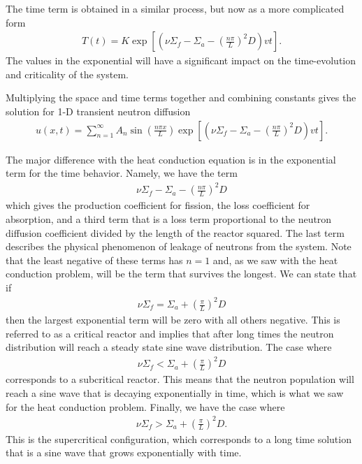 The time term is obtained in a similar process, but now as a more complicated form
\begin{align}
  T(t) = K \exp \left[ \left( \nu \Sigma_f - \Sigma_a - \left( \frac{n \pi}{L} \right)^2 D \right) vt \right] .
\end{align}
The values in the exponential will have a significant impact on the time-evolution and criticality of the system. 

Multiplying the space and time terms together and combining constants gives the solution for 1-D transient neutron diffusion
\begin{align}
  u(x,t) = \sum_{n=1}^\infty A_n \sin \left( \frac{ n \pi x }{ L } \right) \exp \left[ \left( \nu \Sigma_f - \Sigma_a - \left( \frac{n \pi}{L} \right)^2 D \right) v t \right]  .
\end{align}

The major difference with the heat conduction equation is in the exponential term for the time behavior. Namely, we have the term
\begin{align}
   \nu \Sigma_f - \Sigma_a - \left( \frac{n \pi}{L} \right)^2 D \nonumber
\end{align}
which gives the production coefficient for fission, the loss coefficient for absorption, and a third term that is a loss term proportional to the neutron diffusion coefficient divided by the length of the reactor squared. The last term describes the physical phenomenon of leakage of neutrons from the system. Note that the least negative of these terms has $n = 1$ and, as we saw with the heat conduction problem, will be the term that survives the longest. We can state that if
\begin{align}
  \nu \Sigma_f = \Sigma_a + \left( \frac{\pi}{L} \right)^2 D  \nonumber
\end{align}
then the largest exponential term will be zero with all others negative. This is referred to as a critical reactor and implies that after long times the neutron distribution will reach a steady state sine wave distribution. The case where
\begin{align}
  \nu \Sigma_f < \Sigma_a + \left( \frac{\pi}{L} \right)^2 D  \nonumber
\end{align}
corresponds to a subcritical reactor. This means that the neutron population will reach a sine wave that is decaying exponentially in time, which is what we saw for the heat conduction problem. Finally, we have the case where
\begin{align}
  \nu \Sigma_f > \Sigma_a + \left( \frac{\pi}{L} \right)^2 D . \nonumber
\end{align}
This is the supercritical configuration, which corresponds to a long time solution that is a sine wave that grows exponentially with time. 


